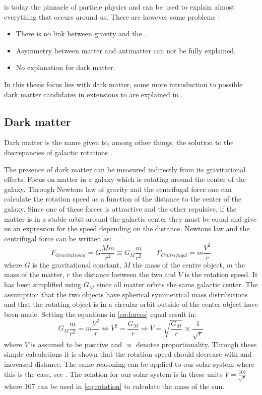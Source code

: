 \abbrSM is today the pinnacle of particle physics and can be used to explain almost everything that occurs around us. There are however some problems \citep{Jungman:1996}:
\begin{itemize}
\item There is no link between gravity and the \abbrSM.
\item Asymmetry between matter and antimatter can not be fully explained.
\item No explanation for dark matter.
\end{itemize} 
In this thesis focus lies with dark matter, some more introduction to possible dark matter candidates in extensions to \abbrSM are explained in .


\subsection{Dark matter}\label{sec:tb:subsec:dark}
Dark matter is the name given to, among other things, the solution to the discrepancies of galactic rotations \citep{darkmatter}.

The presence of dark matter can be measured indirectly from its gravitational effects. Focus on matter in a galaxy which is rotating around the center of the galaxy. Through Newtons law of gravity and the centrifugal force one can calculate the rotation speed as a function of the distance to the center of the galaxy. Since one of these forces is attractive and the other repulsive, if the matter is in a stable orbit around the galactic center they must be equal and give us an expression for the speed depending on the distance. Newtons law and the centrifugal force can be written as:
\begin{equation}\label{eq:forces}
F_{Gravitational}=G \frac{M m}{r^2} \equiv G_M \frac{m}{r^2} \qquad F_{Centrifugal} = m\frac{V^2}{r}
\end{equation}
where $G$ is the gravitational constant, $M$ the mass of the centre object, $m$ the mass of the matter, $r$ the distance between the two and $V$ is the rotation speed. It has been simplified using $G_M$ since all matter orbits the same galactic center. The assumption that the two objects have spherical symmetrical mass distributions and that the rotating object is in a circular orbit outside of the center object have been made. Setting the equations in \eqref{eq:forces} equal result in:
\begin{equation}\label{eq:rotation}
G_M \frac{m}{r^2} = m\frac{V^2}{r} \Leftrightarrow V^2 =\frac{G_M}{r} \Rightarrow V=\sqrt{\frac{G_M}{r}} \propto \frac{1}{\sqrt{r}}
\end{equation}
where $V$ is assumed to be positive and $\propto$ denotes proportionality. Through these simple calculations it is shown that the rotation speed should decrease with and increased distance. The same reasoning can be applied to our solar system where this is the case, see . The relation for our solar system is in these units $V=\frac{107}{\sqrt{r}}$ where 107 can be used in \eqref{eq:rotation} to calculate the mass of the sun.

